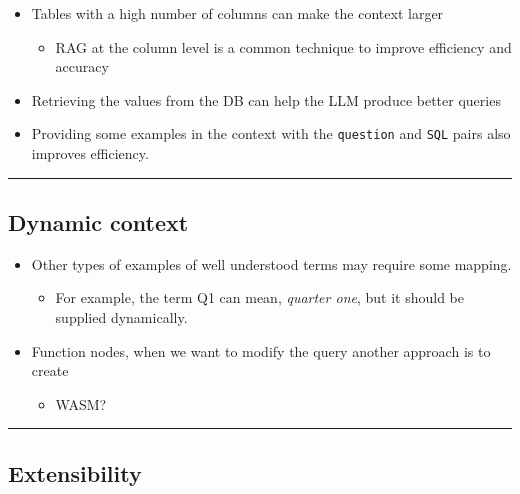 \documentclass[
  letterpaper,
  DIV=11,
  numbers=noendperiod]{scrartcl}
\providecommand{\tightlist}{%
  \setlength{\itemsep}{0pt}\setlength{\parskip}{0pt}}
\begin{document}
\begin{itemize}
\tightlist
\item
  Tables with a high number of columns can make the context larger

  \begin{itemize}
  \tightlist
  \item
    RAG at the column level is a common technique to improve efficiency
    and accuracy
  \end{itemize}
\item
  Retrieving the values from the DB can help the LLM produce better
  queries
\item
  Providing some examples in the context with the \texttt{question} and
  \texttt{SQL} pairs also improves efficiency.
\end{itemize}

\begin{center}\rule{0.5\linewidth}{0.5pt}\end{center}

\subsection{Dynamic context}\label{dynamic-context}

\begin{itemize}
\item
  Other types of examples of well understood terms may require some
  mapping.

  \begin{itemize}
  \tightlist
  \item
    For example, the term Q1 can mean, \emph{quarter one}, but it should
    be supplied dynamically.
  \end{itemize}
\item
  Function nodes, when we want to modify the query another approach is
  to create

  \begin{itemize}
  \tightlist
  \item
    WASM?
  \end{itemize}
\end{itemize}

\begin{center}\rule{0.5\linewidth}{0.5pt}\end{center}

\subsection{Extensibility}\label{extensibility}
\end{document}
